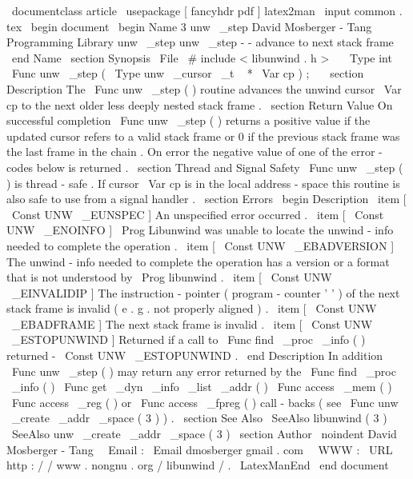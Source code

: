 \
documentclass
{
article
}
\
usepackage
[
fancyhdr
pdf
]
{
latex2man
}
\
input
{
common
.
tex
}
\
begin
{
document
}
\
begin
{
Name
}
{
3
}
{
unw
\
_step
}
{
David
Mosberger
-
Tang
}
{
Programming
Library
}
{
unw
\
_step
}
unw
\
_step
-
-
advance
to
next
stack
frame
\
end
{
Name
}
\
section
{
Synopsis
}
\
File
{
\
#
include
<
libunwind
.
h
>
}
\
\
\
Type
{
int
}
\
Func
{
unw
\
_step
}
(
\
Type
{
unw
\
_cursor
\
_t
~
*
}
\
Var
{
cp
}
)
;
\
\
\
section
{
Description
}
The
\
Func
{
unw
\
_step
}
(
)
routine
advances
the
unwind
cursor
\
Var
{
cp
}
to
the
next
older
less
deeply
nested
stack
frame
.
\
section
{
Return
Value
}
On
successful
completion
\
Func
{
unw
\
_step
}
(
)
returns
a
positive
value
if
the
updated
cursor
refers
to
a
valid
stack
frame
or
0
if
the
previous
stack
frame
was
the
last
frame
in
the
chain
.
On
error
the
negative
value
of
one
of
the
error
-
codes
below
is
returned
.
\
section
{
Thread
and
Signal
Safety
}
\
Func
{
unw
\
_step
}
(
)
is
thread
-
safe
.
If
cursor
\
Var
{
cp
}
is
in
the
local
address
-
space
this
routine
is
also
safe
to
use
from
a
signal
handler
.
\
section
{
Errors
}
\
begin
{
Description
}
\
item
[
\
Const
{
UNW
\
_EUNSPEC
}
]
An
unspecified
error
occurred
.
\
item
[
\
Const
{
UNW
\
_ENOINFO
}
]
\
Prog
{
Libunwind
}
was
unable
to
locate
the
unwind
-
info
needed
to
complete
the
operation
.
\
item
[
\
Const
{
UNW
\
_EBADVERSION
}
]
The
unwind
-
info
needed
to
complete
the
operation
has
a
version
or
a
format
that
is
not
understood
by
\
Prog
{
libunwind
}
.
\
item
[
\
Const
{
UNW
\
_EINVALIDIP
}
]
The
instruction
-
pointer
(
program
-
counter
'
'
)
of
the
next
stack
frame
is
invalid
(
e
.
g
.
not
properly
aligned
)
.
\
item
[
\
Const
{
UNW
\
_EBADFRAME
}
]
The
next
stack
frame
is
invalid
.
\
item
[
\
Const
{
UNW
\
_ESTOPUNWIND
}
]
Returned
if
a
call
to
\
Func
{
find
\
_proc
\
_info
}
(
)
returned
-
\
Const
{
UNW
\
_ESTOPUNWIND
}
.
\
end
{
Description
}
In
addition
\
Func
{
unw
\
_step
}
(
)
may
return
any
error
returned
by
the
\
Func
{
find
\
_proc
\
_info
}
(
)
\
Func
{
get
\
_dyn
\
_info
\
_list
\
_addr
}
(
)
\
Func
{
access
\
_mem
}
(
)
\
Func
{
access
\
_reg
}
(
)
or
\
Func
{
access
\
_fpreg
}
(
)
call
-
backs
(
see
\
Func
{
unw
\
_create
\
_addr
\
_space
}
(
3
)
)
.
\
section
{
See
Also
}
\
SeeAlso
{
libunwind
(
3
)
}
\
SeeAlso
{
unw
\
_create
\
_addr
\
_space
(
3
)
}
\
section
{
Author
}
\
noindent
David
Mosberger
-
Tang
\
\
Email
:
\
Email
{
dmosberger
gmail
.
com
}
\
\
WWW
:
\
URL
{
http
:
/
/
www
.
nongnu
.
org
/
libunwind
/
}
.
\
LatexManEnd
\
end
{
document
}
